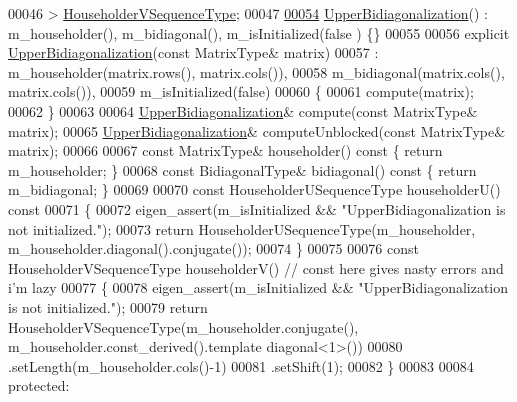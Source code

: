 \begin{DoxyCode}
00046             > \hyperlink{group___householder___module_class_eigen_1_1_householder_sequence}{HouseholderVSequenceType};
00047     
\hyperlink{class_eigen_1_1internal_1_1_upper_bidiagonalization_aa37a7ca5f5e86e3efbc6907d03d89340}{00054}     \hyperlink{class_eigen_1_1internal_1_1_upper_bidiagonalization_aa37a7ca5f5e86e3efbc6907d03d89340}{UpperBidiagonalization}() : m\_householder(), m\_bidiagonal(), m\_isInitialized(false
      ) \{\}
00055 
00056     \textcolor{keyword}{explicit} \hyperlink{class_eigen_1_1internal_1_1_upper_bidiagonalization_aa37a7ca5f5e86e3efbc6907d03d89340}{UpperBidiagonalization}(\textcolor{keyword}{const} MatrixType& matrix)
00057       : m\_householder(matrix.rows(), matrix.cols()),
00058         m\_bidiagonal(matrix.cols(), matrix.cols()),
00059         m\_isInitialized(\textcolor{keyword}{false})
00060     \{
00061       compute(matrix);
00062     \}
00063     
00064     \hyperlink{class_eigen_1_1internal_1_1_upper_bidiagonalization}{UpperBidiagonalization}& compute(\textcolor{keyword}{const} MatrixType& matrix);
00065     \hyperlink{class_eigen_1_1internal_1_1_upper_bidiagonalization}{UpperBidiagonalization}& computeUnblocked(\textcolor{keyword}{const} MatrixType& matrix);
00066     
00067     \textcolor{keyword}{const} MatrixType& householder()\textcolor{keyword}{ const }\{ \textcolor{keywordflow}{return} m\_householder; \}
00068     \textcolor{keyword}{const} BidiagonalType& bidiagonal()\textcolor{keyword}{ const }\{ \textcolor{keywordflow}{return} m\_bidiagonal; \}
00069     
00070     \textcolor{keyword}{const} HouseholderUSequenceType householderU()\textcolor{keyword}{ const}
00071 \textcolor{keyword}{    }\{
00072       eigen\_assert(m\_isInitialized && \textcolor{stringliteral}{"UpperBidiagonalization is not initialized."});
00073       \textcolor{keywordflow}{return} HouseholderUSequenceType(m\_householder, m\_householder.diagonal().conjugate());
00074     \}
00075 
00076     \textcolor{keyword}{const} HouseholderVSequenceType householderV() \textcolor{comment}{// const here gives nasty errors and i'm lazy}
00077     \{
00078       eigen\_assert(m\_isInitialized && \textcolor{stringliteral}{"UpperBidiagonalization is not initialized."});
00079       \textcolor{keywordflow}{return} HouseholderVSequenceType(m\_householder.conjugate(), m\_householder.const\_derived().template 
      diagonal<1>())
00080              .setLength(m\_householder.cols()-1)
00081              .setShift(1);
00082     \}
00083     
00084   \textcolor{keyword}{protected}:

\end{DoxyCode}
